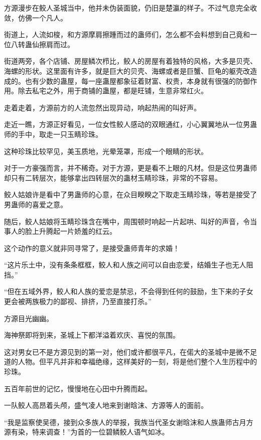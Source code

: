 
\begin{this_body}



方源漫步在鲛人圣城当中，他并未伪装面貌，仍旧是楚瀛的样子。不过气息完全收敛，仿佛一个凡人。

街道上，人流如梭，和方源摩肩擦踵而过的蛊师们，怎么都不会料想到自己竟和一位八转蛊仙擦肩而过。

街道两旁，各个店铺、房屋鳞次栉比，鲛人的房屋有着独特的风格，大多是贝壳、海螺的形状。这里面有许多，就是巨大的贝壳、海螺或者是巨蟹、巨龟的躯壳改造成的。也有少数的蛊屋，每一座蛊屋都象征着财富、权贵，本身就有很强的防御作用。除去私宅之外，用于商铺的蛊屋，都是旺铺，生意非常红火。

走着走着，方源前方的人流忽然出现异动，响起热闹的叫好声。

走近一瞧，方源正好看见，一位女性鲛人感动的双眼通红，小心翼翼地从一位男蛊师的手中，取走一只玉睛珍珠。

这种珍珠比较罕见，美玉质地，光晕笼罩，形成一个眼睛的形状。

对于一方豪强而言，并不稀奇。对于方源，更是看不上眼的凡材。但是这位男蛊师却只有二转层次，能够拿出四转层次的蛊材玉睛珍珠，非常的不容易。

鲛人姑娘许是看中了男蛊师的心意，在众目睽睽之下取走玉睛珍珠，等若是接受了男蛊师的喜爱之意。

随后，鲛人姑娘将玉睛珍珠含在嘴中，周围顿时响起一片起哄、叫好的声音，令当事人的脸上升腾起一片娇羞的红云。

这个动作的意义就非同寻常了，是接受蛊师青年的求婚！

“这片乐土中，没有条条框框，鲛人和人族之间可以自由恋爱，结婚生子也无人阻挡。”

“但在五域外界，鲛人和人族的爱恋是禁忌，不会得到任何的鼓励，生下来的子女更会被两族极力的鄙视、排挤，乃至直接打杀。”

方源目光幽幽。

海神祭即将到来，圣城上下都洋溢着欢庆、喜悦的氛围。

这对男女已不是方源见到的第一对，他们或许都很平凡，在偌大的圣城中是微不足道的人物。但平凡并非和幸福绝缘，这样美好的一刻，将是他们整个人生历程中的珍珠。

五百年前世的记忆，慢慢地在心田中升腾而起。

一队鲛人高昂着头颅，盛气凌人地来到谢晗沫、方源等人的面前。

“我是监察使吴德，接到众多族人的举报，我族当代圣女谢晗沫和人族蛊师古月方源有染，特来调查！”为首的一位碧鳞鲛人语气如冰。


\end{this_body}
